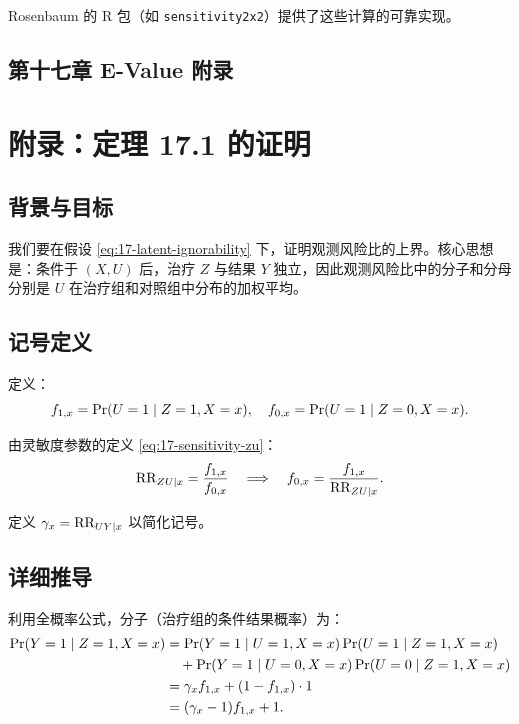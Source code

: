 Rosenbaum 的 R 包（如 \texttt{sensitivity2x2}）提供了这些计算的可靠实现。

\section{第十七章 E-Value 附录}
\chapter{附录：定理 17.1 的证明}\label{sec:appendix-17-proof-theorem}

\section{背景与目标}\label{sec:appendix-17-proof-bg}

我们要在假设 \cref{eq:17-latent-ignorability} 下，证明观测风险比的上界。核心思想是：条件于 $(X,U)$ 后，治疗 $Z$ 与结果 $Y$ 独立，因此观测风险比中的分子和分母分别是 $U$ 在治疗组和对照组中分布的加权平均。

\section{记号定义}\label{sec:appendix-17-proof-notation}

定义：
\begin{equation}
f_{1,x} = \operatorname{Pr}(U=1 \mid Z=1, X=x), \quad f_{0,x} = \operatorname{Pr}(U=1 \mid Z=0, X=x) .
\label{eq:17-app-f-def}
\end{equation}

由灵敏度参数的定义 \cref{eq:17-sensitivity-zu}：
\begin{equation}
\text{RR}_{ZU\mid x} = \frac{f_{1,x}}{f_{0,x}} \quad \Longrightarrow \quad f_{0,x} = \frac{f_{1,x}}{\text{RR}_{ZU\mid x}} .
\label{eq:17-app-fzu-relation}
\end{equation}

定义 $\gamma_x = \text{RR}_{UY\mid x}$ 以简化记号。

\section{详细推导}\label{sec:appendix-17-proof-derivation}

利用全概率公式，分子（治疗组的条件结果概率）为：
\[
\begin{aligned}
\operatorname{Pr}(Y=1 \mid Z=1, X=x)
&= \operatorname{Pr}(Y=1 \mid U=1, X=x) \operatorname{Pr}(U=1 \mid Z=1, X=x) \\
&\quad + \operatorname{Pr}(Y=1 \mid U=0, X=x) \operatorname{Pr}(U=0 \mid Z=1, X=x) \\
&= \gamma_x f_{1,x} + (1 - f_{1,x}) \cdot 1 \\
&= (\gamma_x - 1) f_{1,x} + 1 .
\end{aligned}
\]

